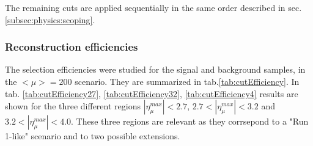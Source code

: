 \documentclass[a4paper,twoside,12pt]{article}
\begin{document}
The remaining cuts are applied sequentially in the same order described in sec.\ref{subsec:physics:scoping}.

\subsubsection{Reconstruction efficiencies}\label{subsec:recoEfficiency}

The selection efficiencies were studied for the signal and background samples, in the $<\mu> = 200$ scenario. They are summarized in 
tab.\ref{tab:cutEfficiency}. In tab. \ref{tab:cutEfficiency27}, \ref{tab:cutEfficiency32}, \ref{tab:cutEfficiency4} results are shown for the three different regions $|\eta_{\mu}^{max}| < 2.7$, 
$2.7 < |\eta_{\mu}^{max}| < 3.2$ and $3.2 < |\eta_{\mu}^{max}| < 4.0$. These three regions are relevant as they corrsepond to a "Run 1-like" scenario and to two possible extensions.\\
\end{document}
